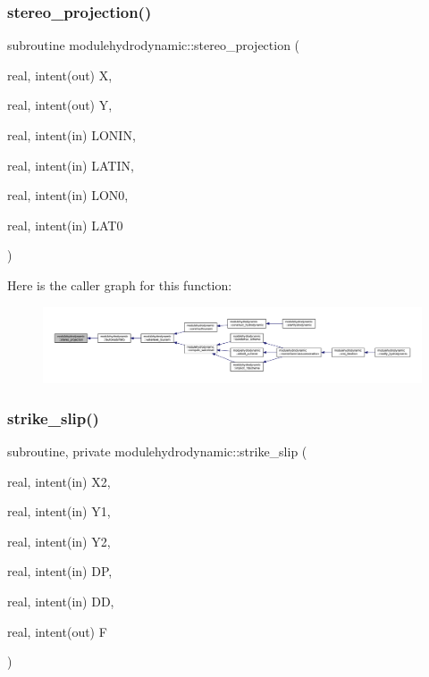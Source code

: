 \subsubsection{\texorpdfstring{stereo\+\_\+projection()}{stereo\_projection()}}
{\footnotesize\ttfamily subroutine modulehydrodynamic\+::stereo\+\_\+projection (\begin{DoxyParamCaption}\item[{real, intent(out)}]{X,  }\item[{real, intent(out)}]{Y,  }\item[{real, intent(in)}]{L\+O\+N\+IN,  }\item[{real, intent(in)}]{L\+A\+T\+IN,  }\item[{real, intent(in)}]{L\+O\+N0,  }\item[{real, intent(in)}]{L\+A\+T0 }\end{DoxyParamCaption})\hspace{0.3cm}{\ttfamily [private]}}

Here is the caller graph for this function\+:\nopagebreak
\begin{figure}[H]
\begin{center}
\leavevmode
\includegraphics[width=350pt]{namespacemodulehydrodynamic_a1d685e489f857af3dd0c69835d0b081d_icgraph}
\end{center}
\end{figure}
\mbox{\label{namespacemodulehydrodynamic_a38a2568403edbdf1d10000f553f39252}} 
\subsubsection{\texorpdfstring{strike\+\_\+slip()}{strike\_slip()}}
{\footnotesize\ttfamily subroutine, private modulehydrodynamic\+::strike\+\_\+slip (\begin{DoxyParamCaption}\item[{real, intent(in)}]{X2,  }\item[{real, intent(in)}]{Y1,  }\item[{real, intent(in)}]{Y2,  }\item[{real, intent(in)}]{DP,  }\item[{real, intent(in)}]{DD,  }\item[{real, intent(out)}]{F }\end{DoxyParamCaption})\hspace{0.3cm}{\ttfamily [private]}}

